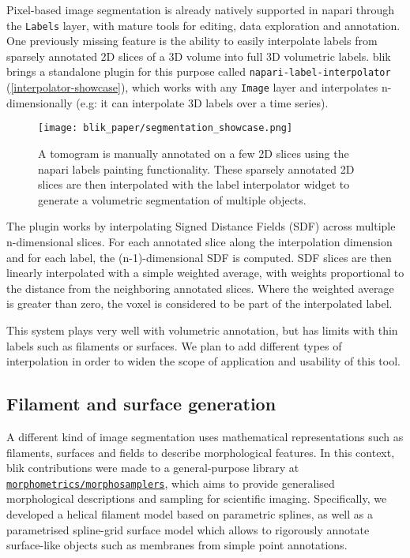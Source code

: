 Pixel-based image segmentation is already natively supported in napari through the \texttt{Labels} layer, with mature tools for editing, data exploration and annotation. One previously missing feature is the ability to easily interpolate labels from sparsely annotated 2D slices of a 3D volume into full 3D volumetric labels. blik brings a standalone plugin for this purpose called \texttt{napari-label-interpolator} (\autoref{interpolator-showcase}), which works with any \texttt{Image} layer and interpolates n-dimensionally (e.g: it can interpolate 3D labels over a time series).

\begin{figure}[!ht]
    \centering
    \texttt{[image: blik\_paper/segmentation\_showcase.png]}
    \caption[Interpolated segmentations]{A tomogram is manually annotated on a few 2D slices using the napari labels painting functionality. These sparsely annotated 2D slices are then interpolated with the label interpolator widget to generate a volumetric segmentation of multiple objects.}
    \label{interpolator-showcase}
\end{figure}

The plugin works by interpolating Signed Distance Fields (SDF) across multiple n-dimensional slices. For each annotated slice along the interpolation dimension and for each label, the (n-1)-dimensional SDF is computed. SDF slices are then linearly interpolated with a simple weighted average, with weights proportional to the distance from the neighboring annotated slices. Where the weighted average is greater than zero, the voxel is considered to be part of the interpolated label.

This system plays very well with volumetric annotation, but has limits with thin labels such as filaments or surfaces. We plan to add different types of interpolation in order to widen the scope of application and usability of this tool.

\subsection{Filament and surface generation}\label{filament-and-surface-generation}

A different kind of image segmentation uses mathematical representations such as filaments, surfaces and fields to describe morphological features. In this context, blik contributions were made to a general-purpose library at \href{https://github.com/morphometrics/morphosamplers}{\texttt{morphometrics\-/\-morphosamplers}}, which aims to provide generalised morphological descriptions and sampling for scientific imaging. Specifically, we developed a helical filament model based on parametric splines, as well as a parametrised spline-grid surface model which allows to rigorously annotate surface-like objects such as membranes from simple point annotations.

